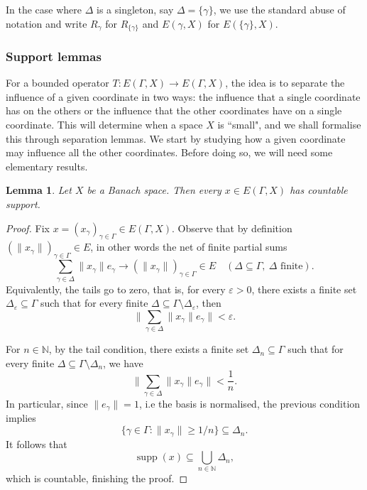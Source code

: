 \documentclass[11pt]{amsart}
\theoremstyle{plain}
\newtheorem{lemma}[theorem]{Lemma}
\theoremstyle{definition}
\numberwithin{equation}{section}
\newcommand{\norm}[1]{\lVert #1 \rVert}
\newcommand{\supp}{\operatorname{supp}}
\renewcommand{\geq}{\geqslant}
\begin{document}
In the case where $\Delta$ is a singleton, say $\Delta = \{\gamma\}$, we use the standard abuse of notation and write $R_\gamma$ for $R_{\{\gamma\}}$ and $E(\gamma, X)$ for $E(\{\gamma\}, X)$. 


\subsubsection{Support lemmas} For a bounded operator $T \colon E(\Gamma, X) \to E(\Gamma, X)$, the idea is to separate the influence of a given coordinate in two ways: the influence that a single coordinate has on the others or the influence that the other coordinates have on a single coordinate. This will determine when a space $X$ is ``small", and we shall formalise this through separation lemmas. We start by studying how a given coordinate may influence all the other coordinates. Before doing so, we will need some elementary results.

\begin{lemma}\label{lem:countable-support-lp-c0}
Let $X$ be a Banach space. Then every $x \in E(\Gamma, X)$ has countable support.
\end{lemma}

\begin{proof}
Fix $x = (x_\gamma)_{\gamma \in \Gamma} \in E(\Gamma, X)$. Observe that by definition $(\norm{x_\gamma})_{\gamma \in \Gamma} \in E$, in other words the net of finite partial sums
\begin{equation*}
    \sum_{\gamma \in \Delta} \norm{x_\gamma} e_\gamma \to (\norm{x_\gamma})_{\gamma \in \Gamma} \in E 
    \quad (\Delta \subseteq \Gamma,\ \Delta \text{ finite}).
\end{equation*}
Equivalently, the tails go to zero, that is, for every $\varepsilon > 0$, there exists a finite set $\Delta_\varepsilon \subseteq \Gamma$ such that for every finite $\Delta \subseteq \Gamma \setminus \Delta_\varepsilon$, then
\begin{equation*}
    \norm{\sum_{\gamma \in \Delta} \norm{x_\gamma} e_\gamma} < \varepsilon.
\end{equation*}

For $n \in \mathbb{N}$, by the tail condition, there exists a finite set $\Delta_n \subseteq \Gamma$ such that for every finite $\Delta \subseteq \Gamma \setminus \Delta_n$, we have
\begin{equation*}
    \norm{\sum_{\gamma \in \Delta} \norm{x_\gamma} e_\gamma} < \frac{1}{n}.
\end{equation*}
In particular, since $\norm{e_\gamma} = 1$, i.e the basis is normalised,  the previous condition implies
\begin{equation*}
    \{ \gamma \in \Gamma : \norm{x_\gamma} \geq 1/n\} \subseteq \Delta_n.
\end{equation*}
It follows that
\begin{equation*}
    \supp(x) \subseteq \bigcup_{n \in \mathbb{N}} \Delta_n,
\end{equation*}
which is countable, finishing the proof.
\end{proof}
\end{document}
